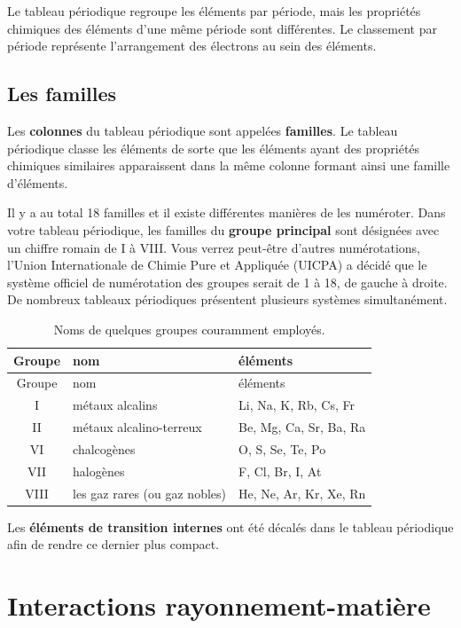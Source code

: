 \documentclass[
  11pt,
  french,
  a4paper,
  openany]{book}
\begin{document}
Le tableau périodique regroupe les éléments par période, mais les propriétés chimiques des éléments d'une même période sont différentes. Le classement par période représente l'arrangement des électrons au sein des éléments.

\hypertarget{les-familles}{%
\subsection{Les familles}\label{les-familles}}

Les \textbf{colonnes} du tableau périodique sont appelées \textbf{familles}. Le tableau périodique classe les éléments de sorte que les éléments ayant des propriétés chimiques similaires apparaissent dans la même colonne formant ainsi une famille d'éléments.

Il y a au total 18 familles et il existe différentes manières de les numéroter. Dans votre tableau périodique, les familles du \textbf{groupe principal} sont désignées avec un chiffre romain de I à VIII. Vous verrez peut-être d'autres numérotations, l'Union Internationale de Chimie Pure et Appliquée (UICPA) a décidé que le système officiel de numérotation des groupes serait de 1 à 18, de gauche à droite. De nombreux tableaux périodiques présentent plusieurs systèmes simultanément.

\begin{longtable}[]{@{}cll@{}}
\caption{\label{tab:noms-groupes-courants} Noms de quelques groupes couramment employés.}\tabularnewline
\toprule
Groupe & nom & éléments\tabularnewline
\midrule
\endfirsthead
\toprule
Groupe & nom & éléments\tabularnewline
\midrule
\endhead
I & métaux alcalins & Li, Na, K, Rb, Cs, Fr\tabularnewline
II & métaux alcalino-terreux & Be, Mg, Ca, Sr, Ba, Ra\tabularnewline
VI & chalcogènes & O, S, Se, Te, Po\tabularnewline
VII & halogènes & F, Cl, Br, I, At\tabularnewline
VIII & les gaz rares (ou gaz nobles) & He, Ne, Ar, Kr, Xe, Rn\tabularnewline
\bottomrule
\end{longtable}

Les \textbf{éléments de transition internes} ont été décalés dans le tableau périodique afin de rendre ce dernier plus compact.

\hypertarget{interactions-rayonnement-matiuxe8re}{%
\section{Interactions rayonnement-matière}\label{interactions-rayonnement-matiuxe8re}}
\end{document}
